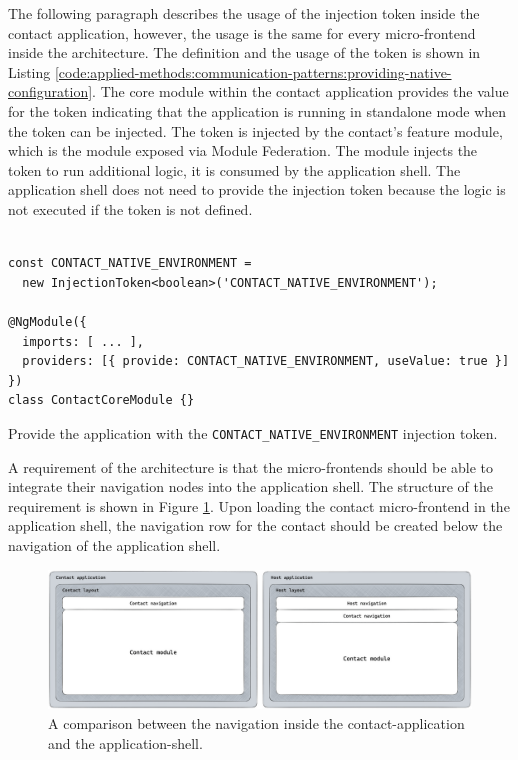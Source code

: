 \bigskip

\noindent The following paragraph describes the usage of the injection token inside the contact application, however, the usage is the same for every micro-frontend inside the architecture. The definition and the usage of the token is shown in Listing \ref{code:applied-methods:communication-patterns:providing-native-configuration}. The core module within the contact application provides the value for the token indicating that the application is running in standalone mode when the token can be injected. The token is injected by the contact's feature module, which is the module exposed via Module Federation. The module injects the token to run additional logic, it is consumed by the application shell. The application shell does not need to provide the injection token because the logic is not executed if the token is not defined.

\ifshowListings
\begin{listing}[H]
  \begin{verbatim}

const CONTACT_NATIVE_ENVIRONMENT = 
  new InjectionToken<boolean>('CONTACT_NATIVE_ENVIRONMENT');

@NgModule({
  imports: [ ... ],
  providers: [{ provide: CONTACT_NATIVE_ENVIRONMENT, useValue: true }]
})
class ContactCoreModule {}
  \end{verbatim}
  \caption{Provide the application with the \texttt{CONTACT\_NATIVE\_ENVIRONMENT} injection token.}\label{code:applied-methods:communication-patterns:providing-native-configuration}
\end{listing}
\fi

\noindent A requirement of the architecture is that the micro-frontends should be able to integrate their navigation nodes into the application shell. The structure of the requirement is shown in Figure \ref{fig:applied-methods:communication-patterns:comparison-between-host-and-contact-layout}. Upon loading the contact micro-frontend in the application shell, the navigation row for the contact should be created below the navigation of the application shell.

\ifshowImages
  \begin{figure}[H]
  \centering
  \includegraphics[width=1\linewidth]{images/applied-methods/communication-patterns/layout-comparison.jpg}
  \caption{A comparison between the navigation inside the contact-application and the application-shell.}\label{fig:applied-methods:communication-patterns:comparison-between-host-and-contact-layout}
  \end{figure}
\fi


